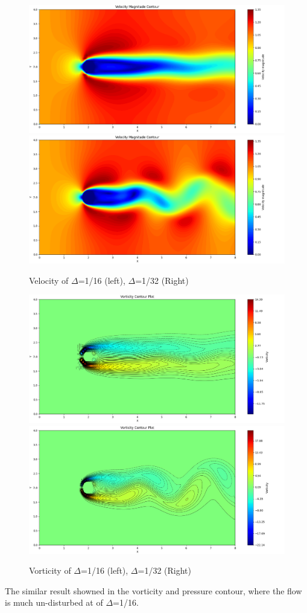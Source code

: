 \documentclass[12pt]{article}
\begin{document}
\begin{figure}[H]
    \centering
    \includegraphics[width=0.45\linewidth]{figure/N16_Re150_8x4_t50/v_N16_Re150_8x4_t50.jpg}
    \includegraphics[width=0.45\linewidth]{figure/N32_Re150_8x4_t50/v_N32_Re150_8x4_t50.jpg}
    \caption{Velocity of $\Delta$=1/16 (left), $\Delta$=1/32 (Right) }
\end{figure}



\begin{figure}[H]
    \centering
    \includegraphics[width=0.45\linewidth]{figure/N16_Re150_8x4_t50/vor_N16_Re150_8x4_t50.jpg}
    \includegraphics[width=0.45\linewidth]{figure/N32_Re150_8x4_t50/vor_N32_Re150_8x4_t50.jpg}
    \caption{Vorticity of $\Delta$=1/16 (left), $\Delta$=1/32 (Right) }
\end{figure}

The similar result showned in the vorticity and pressure contour, where the flow is much un-disturbed at of $\Delta$=1/16.
\end{document}
